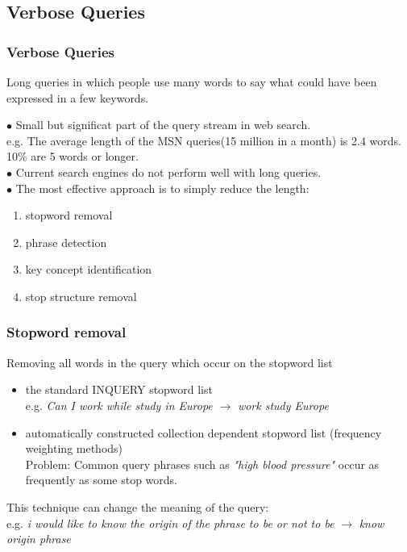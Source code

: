 \subsection{Verbose Queries}

\begin{frame}
\frametitle{Verbose Queries}
\begin{block}
	{Long queries in which people use many words to say what could have been expressed in a few keywords.}
\end{block}
$\bullet$
	Small but significat part of the query stream in web search.\\
	e.g. The average length of the MSN queries(15 million in a month) is 2.4 words. 10\% are 5 words or longer.\\
\vskip10pt
$\bullet$
	Current search engines do not perform well with long queries.\\
\vskip10pt
$\bullet$
	The most effective approach is to simply reduce the length:
	\begin{enumerate}
	\item
		stopword removal
	\item
		phrase detection
	\item
		key concept identification
	\item
		stop structure removal
	\end{enumerate}
\end{frame}

\begin{frame}
\frametitle{Stopword removal}
\begin{block}
	{Removing all words in the query which occur on the stopword list}
\end{block}
\begin{itemize}
\item
the standard INQUERY stopword list \\
e.g. \textit{Can I work while study in Europe} $\rightarrow$ \textit{work study Europe}	
\item
automatically constructed collection dependent stopword list (frequency weighting methods)\\
Problem: Common query phrases such as \textit{"high blood pressure"} occur as frequently as some stop words.
\end{itemize}
\vskip10pt
This technique can change the meaning of the query:\\
e.g. \textit{i would like to know the origin of the phrase to be or not to be} $\rightarrow$ \textit{know origin phrase}
\end{frame}

